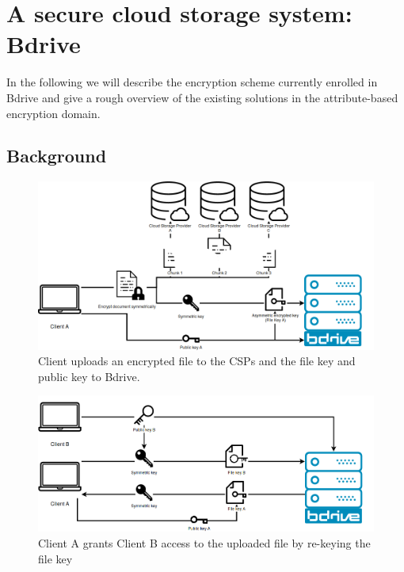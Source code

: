 \section{A secure cloud storage system: Bdrive}
In the following we will describe the encryption scheme currently enrolled in Bdrive and give a rough overview of the existing solutions in the attribute-based encryption domain.

\subsection{Background}
\begin{figure}[!ht]
\centering
    \includegraphics[width=0.8\linewidth]{img/bdrive1.png}\par 
    \caption{Client uploads an encrypted file to the CSPs and the file key and public key to Bdrive.}
    \label{fig:filekey}
\end{figure}
\begin{figure}[!ht]
\centering
    \includegraphics[width=0.8\linewidth]{img/bdrive2.png}\par
    \caption{Client A grants Client B access to the uploaded file by re-keying the file key}
    \label{fig:rekey}
\end{figure}

